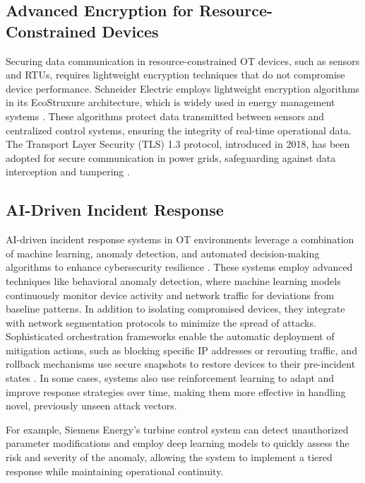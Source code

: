 \subsection {Advanced Encryption for Resource-Constrained Devices} 
Securing data communication in resource-constrained OT devices, such as sensors and RTUs, requires lightweight encryption techniques that do not compromise device performance.
Schneider Electric employs lightweight encryption algorithms in its EcoStruxure architecture, which is widely used in energy management systems \cite{abir2024industry}. These algorithms protect data transmitted between sensors and centralized control systems, ensuring the integrity of real-time operational data. The Transport Layer Security (TLS) 1.3 protocol, introduced in 2018, has been adopted for secure communication in power grids, safeguarding against data interception and tampering \cite{restuccia2020low}.

\subsection {AI-Driven Incident Response}
AI-driven incident response systems in OT environments leverage a combination of machine learning, anomaly detection, and automated decision-making algorithms to enhance cybersecurity resilience \cite{nutalapati2024automated}. These systems employ advanced techniques like behavioral anomaly detection, where machine learning models continuously monitor device activity and network traffic for deviations from baseline patterns\cite{he2020intelligent}. In addition to isolating compromised devices, they integrate with network segmentation protocols to minimize the spread of attacks. Sophisticated orchestration frameworks enable the automatic deployment of mitigation actions, such as blocking specific IP addresses or rerouting traffic, and rollback mechanisms use secure snapshots to restore devices to their pre-incident states \cite{zhou2020unified}. In some cases, systems also use reinforcement learning to adapt and improve response strategies over time, making them more effective in handling novel, previously unseen attack vectors. 

For example, Siemens Energy’s turbine control system can detect unauthorized parameter modifications and employ deep learning models to quickly assess the risk and severity of the anomaly, allowing the system to implement a tiered response while maintaining operational continuity.

